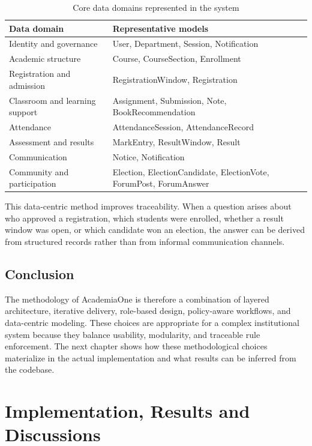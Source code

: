 \documentclass[12pt,a4paper]{report}
\newcommand{\systemName}{AcademiaOne}
\begin{document}
\begin{table}[H]
  \centering
  \caption{Core data domains represented in the system}
  \label{tab:data-domains}
  \renewcommand{\arraystretch}{1.2}
  \begin{tabularx}{\textwidth}{p{1.7in}Y}
    \toprule
    \textbf{Data domain} & \textbf{Representative models} \\
    \midrule
    Identity and governance & User, Department, Session, Notification \\
    Academic structure & Course, CourseSection, Enrollment \\
    Registration and admission & RegistrationWindow, Registration \\
    Classroom and learning support & Assignment, Submission, Note, BookRecommendation \\
    Attendance & AttendanceSession, AttendanceRecord \\
    Assessment and results & MarkEntry, ResultWindow, Result \\
    Communication & Notice, Notification \\
    Community and participation & Election, ElectionCandidate, ElectionVote, ForumPost, ForumAnswer \\
    \bottomrule
  \end{tabularx}
\end{table}

This data-centric method improves traceability. When a question arises about who approved a registration, which students were enrolled, whether a result window was open, or which candidate won an election, the answer can be derived from structured records rather than from informal communication channels.

\section{Conclusion}
The methodology of \systemName{} is therefore a combination of layered architecture, iterative delivery, role-based design, policy-aware workflows, and data-centric modeling. These choices are appropriate for a complex institutional system because they balance usability, modularity, and traceable rule enforcement. The next chapter shows how these methodological choices materialize in the actual implementation and what results can be inferred from the codebase.

\chapter{Implementation, Results and Discussions}
\end{document}
